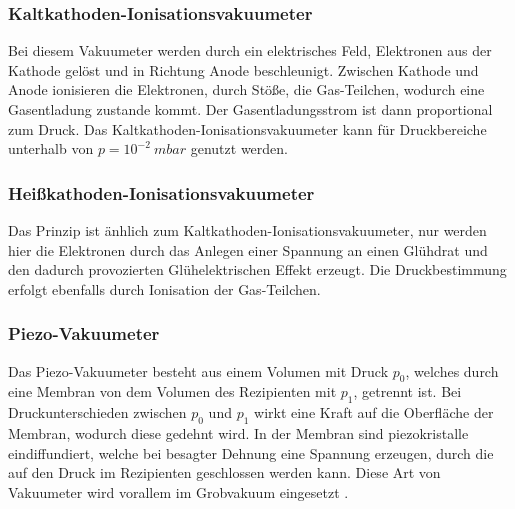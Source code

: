 \subsubsection{Kaltkathoden-Ionisationsvakuumeter}
Bei diesem Vakuumeter werden durch ein elektrisches Feld, Elektronen aus der Kathode gelöst und in Richtung Anode beschleunigt.
Zwischen Kathode und Anode ionisieren die Elektronen, durch Stöße, die Gas-Teilchen, wodurch eine Gasentladung zustande kommt.
Der Gasentladungsstrom ist dann proportional zum Druck.
Das Kaltkathoden-Ionisationsvakuumeter kann für Druckbereiche unterhalb von $p = 10^{-2}\: mbar$ genutzt werden\cite{Pfeiffer, S.94}.

\subsubsection{Heißkathoden-Ionisationsvakuumeter}
Das Prinzip ist änhlich zum Kaltkathoden-Ionisationsvakuumeter, nur werden hier die Elektronen durch das Anlegen einer Spannung an einen Glühdrat und den dadurch provozierten 
Glühelektrischen Effekt erzeugt. Die Druckbestimmung erfolgt ebenfalls durch Ionisation der Gas-Teilchen\cite{Pfeiffer, S.94,95}.

\subsubsection{Piezo-Vakuumeter}
Das Piezo-Vakuumeter besteht aus einem Volumen mit Druck $p_0$, welches durch eine Membran von dem Volumen des Rezipienten mit $p_1$, getrennt ist.
Bei Druckunterschieden zwischen $p_0$ und $p_1$ wirkt eine Kraft auf die Oberfläche der Membran, wodurch diese gedehnt wird. In der Membran sind 
piezokristalle eindiffundiert, welche bei besagter Dehnung eine Spannung erzeugen, durch die auf den Druck im Rezipienten geschlossen werden kann.
Diese Art von Vakuumeter wird vorallem im Grobvakuum eingesetzt \cite{Pfeiffer, S.92}.
















